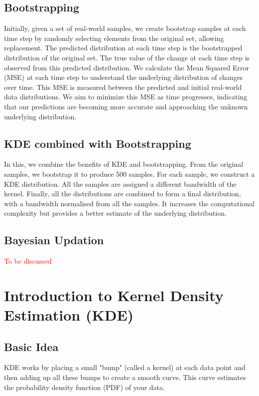 \documentclass[conference]{IEEEtran}
\begin{document}
\subsection{Bootstrapping}
Initially, given a set of real-world samples, we create bootstrap samples at each time step by randomly selecting elements from the original set, allowing replacement. The predicted distribution at each time step is the bootstrapped distribution of the original set. The true value of the change at each time step is observed from this predicted distribution. We calculate the Mean Squared Error (MSE) at each time step to understand the underlying distribution of changes over time. This MSE is measured between the predicted and initial real-world data distributions. We aim to minimize this MSE as time progresses, indicating that our predictions are becoming more accurate and approaching the unknown underlying distribution.



\subsection{KDE combined with Bootstrapping}
In this, we combine the benefits of KDE and bootstrapping. From the original samples, we bootstrap it to produce 500 samples. For each sample, we construct a KDE distribution. All the samples are assigned a different bandwidth of the kernel. Finally, all the distributions are combined to form a final distribution, with a bandwidth normalised from all the samples. It increases the computational complexity but provides a better estimate of the underlying distribution.

\subsection{Bayesian Updation}
\textcolor{red}{To be discussed}

\section{Introduction to Kernel Density Estimation (KDE)}

\subsection{Basic Idea}

KDE works by placing a small "bump" (called a kernel) at each data point and then adding up all these bumps to create a smooth curve. This curve estimates the probability density function (PDF) of your data.
\end{document}
